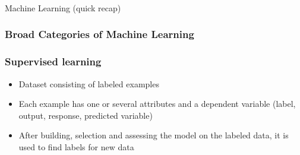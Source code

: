 
\begin{frame}[fragile]\frametitle{}

\begin{center}
{\Large Machine Learning (quick recap)}
\end{center}
\end{frame}


\begin{frame}[fragile]\frametitle{Broad Categories of Machine Learning}
\hfill
{}

\end{frame}

\begin{frame}[fragile]\frametitle{Supervised learning}
  \begin{itemize}
    \item Dataset consisting of labeled examples
    \item Each example has one or several attributes and a dependent variable (label, output, response, predicted variable)
    \item After building, selection and assessing the model on the labeled data, 
it is used to find labels for new data
  \end{itemize}
\end{frame}

